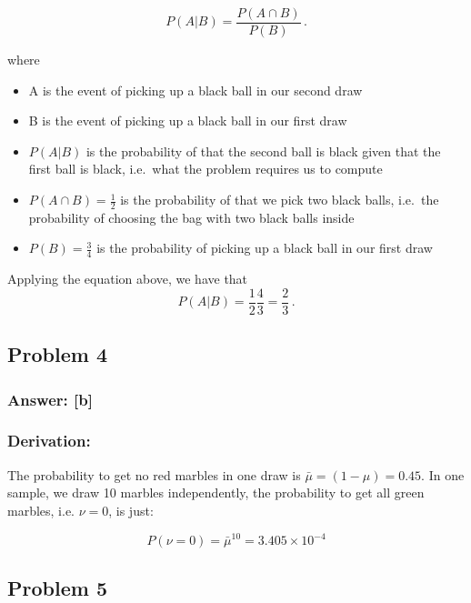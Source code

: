 \documentclass[11pt]{article}
\providecommand{\tightlist}{%
      \setlength{\itemsep}{0pt}\setlength{\parskip}{0pt}}
\begin{document}
\[
P(A|B)=\frac{P(A \cap B)}{P(B)}\,.
\]

where

\begin{itemize}
\tightlist
\item
  A is the event of picking up a black ball in our second draw
\item
  B is the event of picking up a black ball in our first draw
\item
  \(P(A|B)\) is the probability of that the second ball is black given
  that the first ball is black, i.e.~what the problem requires us to
  compute
\item
  \(P(A \cap B)=\frac{1}{2}\) is the probability of that we pick two
  black balls, i.e.~the probability of choosing the bag with two black
  balls inside
\item
  \(P(B)=\frac{3}{4}\) is the probability of picking up a black ball in
  our first draw
\end{itemize}

Applying the equation above, we have that \[
P(A|B)=\frac{1}{2}\frac{4}{3}=\frac{2}{3}\,.
\]

    \hypertarget{problem-4}{%
\subsection{Problem 4}\label{problem-4}}

\hypertarget{answer-b}{%
\subsubsection{Answer: {[}b{]}}\label{answer-b}}

\hypertarget{derivation}{%
\subsubsection{Derivation:}\label{derivation}}

The probability to get no red marbles in one draw is
\(\bar{\mu}=(1-\mu)=0.45\). In one sample, we draw 10 marbles
independently, the probability to get all green marbles, i.e. \(\nu=0\),
is just:

\[
\label{noredonesample}
P(\nu= 0)=\bar{\mu}^{10}=3.405 \times 10^{-4}
\]

    \hypertarget{problem-5}{%
\subsection{Problem 5}\label{problem-5}}
\end{document}
